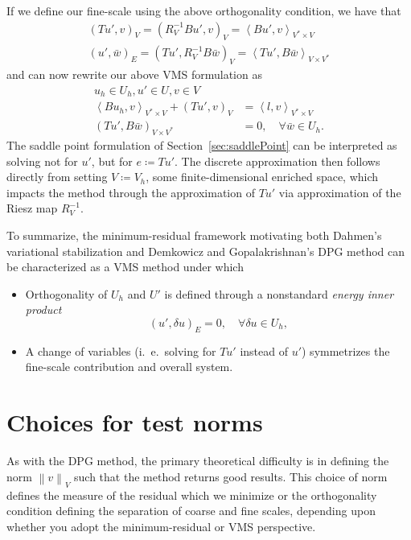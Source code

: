 \documentclass[final,leqno]{siamltex}
\newcommand{\nor}[1]{\left\| #1 \right\|}
\newcommand{\LRp}[1]{\left( #1 \right)}
\newcommand{\LRa}[1]{\left\langle #1 \right\rangle}
\begin{document}
If we define our fine-scale using the above orthogonality condition, we have that
\begin{align*}
\LRp{Tu',v}_V = \LRp{R_V^{-1}Bu',v}_V = \LRa{Bu',v}_{V^*\times V}\\
\LRp{u',\bar{w}}_E = \LRp{Tu',R_V^{-1}B\bar{w}}_V = \LRa{Tu',B\bar{w}}_{V\times V^*}
\end{align*}
and can now rewrite our above VMS formulation as 
\begin{align*}
u_h \in U_h, u' \in U, v \in V\\
\LRa{Bu_h,v}_{V^*\times V} + \LRp{Tu',v}_{V} &= \LRa{l,v}_{V^*\times V}\\
\LRp{Tu',B\bar{w}}_{V\times V^*} &= 0, \quad \forall \bar{w} \in U_h.
\end{align*}
The saddle point formulation of Section~\ref{sec:saddlePoint} can be interpreted as solving not for $u'$, but for $e\coloneqq Tu'$.  The discrete approximation then follows directly from setting $V \coloneqq V_h$, some finite-dimensional enriched space, which impacts the method through the approximation of $Tu'$ via approximation of the Riesz map $R_V^{-1}$.  

To summarize, the minimum-residual framework motivating both Dahmen's variational stabilization and Demkowicz and Gopalakrishnan's DPG method can be characterized as a VMS method under which 
\begin{itemize}
\item Orthogonality of $U_h$ and $U'$ is defined through a nonstandard \textit{energy inner product} $$\LRp{u',\delta u}_E = 0, \quad\forall \delta u \in U_h,$$ 
\item A change of variables (i.\ e.\ solving for $Tu'$ instead of $u'$) symmetrizes the fine-scale contribution and overall system.
\end{itemize}

\section{Choices for test norms}

As with the DPG method, the primary theoretical difficulty is in defining the norm $\nor{v}_V$ such that the method returns good results.  This choice of norm defines the measure of the residual which we minimize or the orthogonality condition defining the separation of coarse and fine scales, depending upon whether you adopt the minimum-residual or VMS perspective.  
\end{document}
